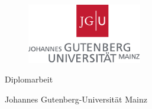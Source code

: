 


\makeatletter
\begin{titlepage}	
  
  \begin{figure}[h]
    \centering
    \includegraphics[angle=0,width=5cm]{img/JGU}
  \end{figure}

  \begin{center}
    \LARGE{\@title}
  \end{center}

  \vfill

  \begin{center}
      \Large{ \@author }

      \large{ \@date   }
  \end{center} 

  \vfill

  \begin{center}
    \Huge{Diplomarbeit}
  \end{center}

  \vfill

  \begin{center}
    \large{Johannes Gutenberg-Universität Mainz}
  \end{center}
  
  \vfill
    
\end{titlepage}
\makeatother

